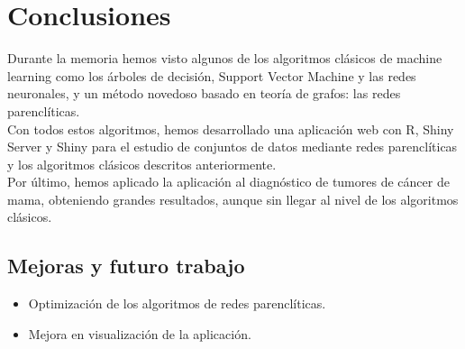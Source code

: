 \chapter{Conclusiones}
Durante la memoria hemos visto algunos de los algoritmos clásicos de machine learning como los árboles de decisión, Support  Vector Machine y las redes neuronales, y un método novedoso basado en teoría de grafos: las redes parenclíticas.\\

Con todos estos algoritmos, hemos desarrollado una aplicación web con R, Shiny Server y Shiny para el estudio de conjuntos de datos mediante redes parenclíticas y los algoritmos clásicos descritos anteriormente.\\

Por último, hemos aplicado la aplicación al diagnóstico de tumores de cáncer de mama, obteniendo grandes resultados, aunque sin llegar al nivel de los algoritmos clásicos.
   
\section{Mejoras y futuro trabajo}

\begin{itemize}
	\item Optimización de los algoritmos de redes parenclíticas.
	\item Mejora en visualización de la aplicación.
\end{itemize}